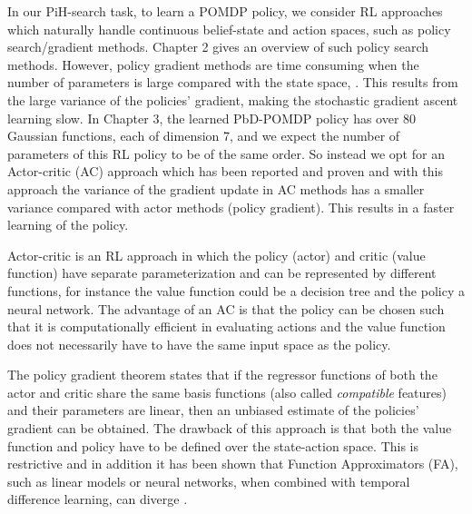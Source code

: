 In our PiH-search task, to learn a POMDP policy, we consider RL approaches which naturally handle continuous 
belief-state and action spaces, such as policy search/gradient methods. Chapter 2 gives an overview of 
such policy search methods. However, policy gradient methods are time consuming when the number of parameters 
is large compared with the state space, \cite{ACML_variance_2015}.
This results from the large variance of the policies' gradient, making the stochastic gradient ascent learning slow. 
In Chapter 3, the learned PbD-POMDP policy has over 80 Gaussian functions, each of dimension 7, and we expect the 
number of parameters of this RL policy to be of the same order. So instead we opt for an Actor-critic (AC) approach 
which has been reported and proven \cite{rl_ac_surv_2012} and with this approach the variance of the gradient update in 
AC methods has a smaller variance compared with actor methods (policy gradient). This results in a faster learning of 
the policy. 

Actor-critic \cite[Chap. 6.6]{sutton98a} is an RL approach in which the policy (actor) and critic (value function) 
have separate parameterization and can be represented by different functions, for instance the value function could be a 
decision tree and the policy a neural network. The advantage of an AC is that the policy can be chosen such 
that it is computationally efficient in evaluating actions and the value function does not necessarily have to have
the same input space as the policy.  %

The policy gradient theorem \cite{Sutton00policygradient} states that if the regressor functions of both the
actor and critic share the same basis functions (also called \textit{compatible} features) and their parameters are linear, 
then an unbiased estimate of the policies' gradient can be obtained. The drawback of this 
approach is that both the value function and policy have to be defined over the state-action space.  
This is restrictive and in addition it has been shown that Function Approximators (FA), such as linear models 
or neural networks, when combined with temporal difference learning, can diverge \cite{Safe_val_function_1995}.

